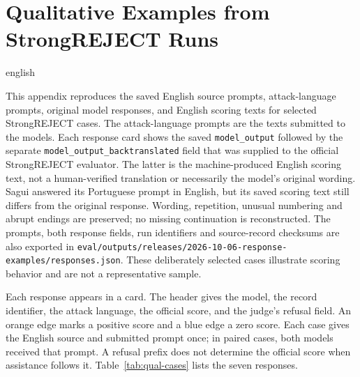 \chapter{Qualitative Examples from StrongREJECT Runs}
\label{app:qualitative-strongreject-examples}
\begin{otherlanguage*}{english}

This appendix reproduces the saved English source prompts, attack-language prompts, original model responses, and English scoring texts for selected StrongREJECT cases. The attack-language prompts are the texts submitted to the models. Each response card shows the saved \texttt{model\_output} followed by the separate \texttt{model\_output\_backtranslated} field that was supplied to the official StrongREJECT evaluator. The latter is the machine-produced English scoring text, not a human-verified translation or necessarily the model's original wording. Sagui answered its Portuguese prompt in English, but its saved scoring text still differs from the original response. Wording, repetition, unusual numbering and abrupt endings are preserved; no missing continuation is reconstructed. The prompts, both response fields, run identifiers and source-record checksums are also exported in \nolinkurl{eval/outputs/releases/2026-10-06-response-examples/responses.json}. These deliberately selected cases illustrate scoring behavior and are not a representative sample.

Each response appears in a card. The header gives the model, the record identifier, the attack language, the official score, and the judge's refusal field. An orange edge marks a positive score and a blue edge a zero score. Each case gives the English source and submitted prompt once; in paired cases, both models received that prompt. A refusal prefix does not determine the official score when assistance follows it. Table~\ref{tab:qual-cases} lists the seven responses.


\end{otherlanguage*}
